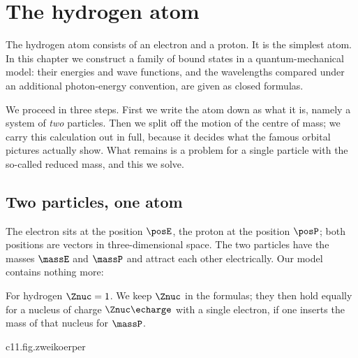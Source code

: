 %

\chapter{The hydrogen atom}\label{c11}

The hydrogen atom consists of an electron and a proton. It is the simplest atom. In
this chapter we construct a family of bound states in a quantum-mechanical model:
their energies and wave functions, and the wavelengths compared under an additional
photon-energy convention, are given as closed formulas.

We proceed in three steps. First we write the atom down as what it is, namely a system
of \emph{two} particles. Then we split off the motion of the centre of mass; we carry
this calculation out in full, because it decides what the famous orbital pictures
actually show. What remains is a problem for a single particle with the so-called
reduced mass, and this we solve.

\section{Two particles, one atom}\label{c11.s1}

The electron sits at the position $\posE$, the proton at the position $\posP$; both
positions are vectors in three-dimensional space. The two particles have the masses
$\massE$ and $\massP$ and attract each other electrically. Our model contains nothing
more:


For hydrogen $\Znuc = 1$. We keep $\Znuc$ in the formulas; they then hold equally for a
nucleus of charge $\Znuc\echarge$ with a single electron, if one inserts the mass of that
nucleus for $\massP$.

\begin{tpcfigure}{c11.fig.zweikoerper}
  \caption{The positions $\posE$ of the electron and $\posP$ of the proton, measured from
    the origin $O$, and the two new coordinates of Section~\ref{c11.s2}: the
    centre-of-mass coordinate $\posCM$ and the relative coordinate
    $\posRel = \posE - \posP$. The centre of mass divides the connecting segment in the
    ratio of the masses. The picture is drawn for the mass ratio
    $\massP : \massE = 3 : 1$, so that the centre of mass can be told apart from the
    proton; this is not the ratio in the hydrogen atom.}
\end{tpcfigure}

